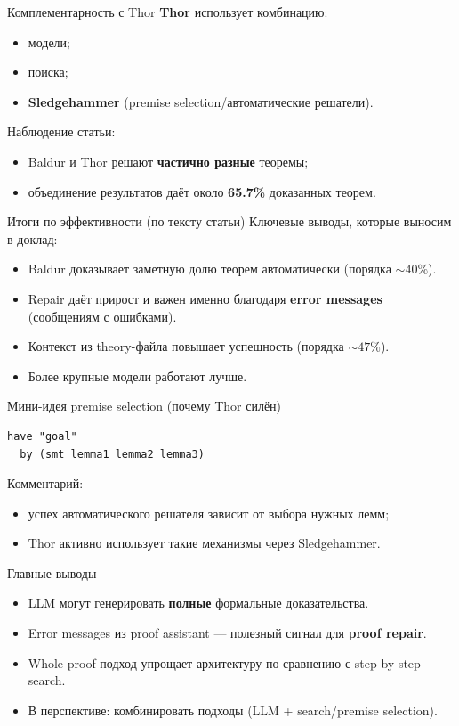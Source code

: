 


\begin{frame}{Комплементарность с Thor}
\textbf{Thor} использует комбинацию:
\begin{itemize}
  \item модели;
  \item поиска;
  \item \textbf{Sledgehammer} (premise selection/автоматические решатели).
\end{itemize}

\vspace{2mm}
Наблюдение статьи:
\begin{itemize}
  \item Baldur и Thor решают \textbf{частично разные} теоремы;
  \item объединение результатов даёт около \textbf{65.7\%} доказанных теорем.
\end{itemize}
\end{frame}

\begin{frame}{Итоги по эффективности (по тексту статьи)}
Ключевые выводы, которые выносим в доклад:
\begin{itemize}
  \item Baldur доказывает заметную долю теорем автоматически (порядка \(\sim 40\%\)).
  \item Repair даёт прирост и важен именно благодаря \textbf{error messages} (сообщениям с ошибками).
  \item Контекст из theory-файла повышает успешность (порядка \(\sim 47\%\)).
  \item Более крупные модели работают лучше.
\end{itemize}
\end{frame}

\begin{frame}[fragile]{Мини-идея premise selection (почему Thor силён)}
\lstset{style=code, language=}
\begin{lstlisting}
have "goal"
  by (smt lemma1 lemma2 lemma3)
\end{lstlisting}

Комментарий:
\begin{itemize}
  \item успех автоматического решателя зависит от выбора нужных лемм;
  \item Thor активно использует такие механизмы через Sledgehammer.
\end{itemize}
\end{frame}

\begin{frame}{Главные выводы}
\begin{itemize}
  \item LLM могут генерировать \textbf{полные} формальные доказательства.
  \item Error messages из proof assistant — полезный сигнал для \textbf{proof repair}.
  \item Whole-proof подход упрощает архитектуру по сравнению с step-by-step search.
  \item В перспективе: комбинировать подходы (LLM + search/premise selection).
\end{itemize}
\end{frame}